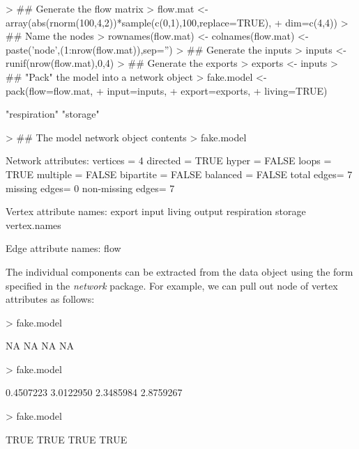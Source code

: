 \documentclass[article]{jss}
\begin{document}
\begin{Schunk}
\begin{Sinput}
> ## Generate the flow matrix
> flow.mat <- array(abs(rnorm(100,4,2))*sample(c(0,1),100,replace=TRUE),
+                    dim=c(4,4))
> ## Name the nodes
> rownames(flow.mat) <- colnames(flow.mat) <- paste('node',(1:nrow(flow.mat)),sep='')
> ## Generate the inputs
> inputs <- runif(nrow(flow.mat),0,4)
> ## Generate the exports
> exports <- inputs
> ## "Pack" the model into a network object
> fake.model <- pack(flow=flow.mat,
+                     input=inputs,
+                     export=exports,
+                     living=TRUE)
\end{Sinput}
\begin{Soutput}
[1] "respiration" "storage"    
\end{Soutput}
\begin{Sinput}
> ## The model network object contents
> fake.model
\end{Sinput}
\begin{Soutput}
 Network attributes:
  vertices = 4 
  directed = TRUE 
  hyper = FALSE 
  loops = TRUE 
  multiple = FALSE 
  bipartite = FALSE 
  balanced = FALSE 
  total edges= 7 
    missing edges= 0 
    non-missing edges= 7 

 Vertex attribute names: 
    export input living output respiration storage vertex.names 

 Edge attribute names: 
    flow 
\end{Soutput}
\end{Schunk}

The individual components can be extracted from the data object using
the form specified in the \textit{network} package.  For example, we
can pull out node of vertex attributes as follows:

\begin{Schunk}
\begin{Sinput}
> fake.model%
\end{Sinput}
\begin{Soutput}
[1] NA NA NA NA
\end{Soutput}
\begin{Sinput}
> fake.model%
\end{Sinput}
\begin{Soutput}
[1] 0.4507223 3.0122950 2.3485984 2.8759267
\end{Soutput}
\begin{Sinput}
> fake.model%
\end{Sinput}
\begin{Soutput}
[1] TRUE TRUE TRUE TRUE
\end{Soutput}
\end{Schunk}
\end{document}
